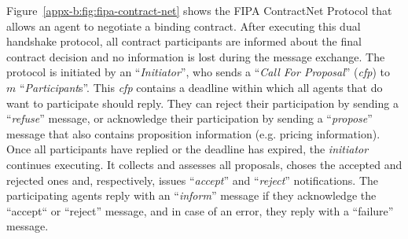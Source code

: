 Figure~\ref{appx-b:fig:fipa-contract-net} shows the FIPA ContractNet Protocol that allows an agent to negotiate a binding contract.
After executing this dual handshake protocol, all contract participants are informed about the final contract decision and no information is lost during the message exchange.
The protocol is initiated by an ``\textit{Initiator}'', who sends a ``\textit{Call For Proposal}'' (\textit{cfp}) to $m$ ``\textit{Participant}s''.
This \textit{cfp} contains a deadline within which all agents that do want to participate should reply.
They can reject their participation by sending a ``\textit{refuse}'' message, or acknowledge their participation by sending a ``\textit{propose}'' message that also contains proposition information (e.g. pricing information).
Once all participants have replied or the deadline has expired, the \textit{initiator} continues executing.
It collects and assesses all proposals, choses the accepted and rejected ones and, respectively, issues ``\textit{accept}'' and ``\textit{reject}'' notifications.
The participating agents reply with an ``\textit{inform}'' message if they acknowledge the ``accept`` or ``reject'' message, and in case of an error, they reply with a ``failure'' message.






